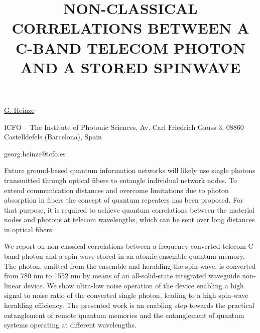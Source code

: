 \title{NON-CLASSICAL CORRELATIONS BETWEEN A C-BAND TELECOM PHOTON AND A STORED SPINWAVE}

\underline{G. Heinze} 

{\normalsize{\vspace{-4mm}
ICFO -- The Institute of Photonic Sciences,
Av. Carl Friedrich Gauss 3,
08860 Castelldefels (Barcelona), Spain

\email georg.heinze@icfo.es}}

Future ground-based quantum information networks will likely use single photons transmitted through optical fibers to entangle individual network nodes. To extend communication distances and overcome limitations due to photon absorption in fibers the concept of quantum repeaters has been proposed. For that purpose, it is required to achieve quantum correlations between the material nodes and photons at telecom wavelengths, which can be sent over long distances in optical fibers.

We report on non-classical correlations between a frequency converted telecom C-band photon and a spin-wave stored in an atomic ensemble quantum memory. The photon, emitted from the ensemble and heralding the spin-wave, is converted from 780 nm to 1552 nm by means of an all-solid-state integrated waveguide non-linear device. We show ultra-low noise operation of the device enabling a high signal to noise ratio of the converted single photon, leading to a high spin-wave heralding efficiency. The presented work is an enabling step towards the practical entanglement of remote quantum memories and the entanglement of quantum systems operating at different wavelengths.

%
%
%
%
%
%



\vspace{\baselineskip} 